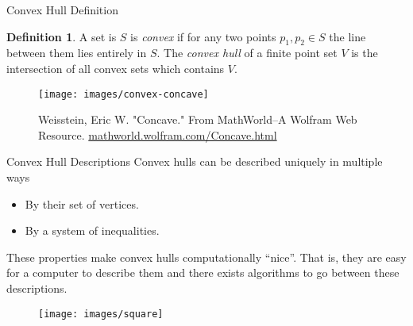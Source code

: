 \documentclass[9pt]{beamer}
\theoremstyle{definition}
\newtheorem{defn}{Definition}
\begin{document}
\begin{frame}[fragile]{Convex Hull Definition}
  \begin{defn}
    A set is $S$ is \emph{convex} if for any two points $p_1, p_2 \in S$ the line
    between them lies entirely in $S$. The \emph{convex hull} of a finite point set
    $V$ is the intersection of all convex sets which contains $V$.
  \end{defn}

  \begin{figure}
    \texttt{[image: images/convex-concave]}
    \caption{Weisstein, Eric W. "Concave." From MathWorld--A Wolfram Web Resource. \url{mathworld.wolfram.com/Concave.html}}

  \end{figure}
  
\end{frame}

\begin{frame}[fragile]{Convex Hull Descriptions}
  Convex hulls can be described uniquely in multiple ways

  \begin{itemize}
  \item By their set of vertices.
  \item By a system of inequalities.
  \end{itemize}

  These properties make convex hulls computationally ``nice''. That is, they are
  easy for a computer to describe them and there exists algorithms to go between
  these descriptions.
  \begin{figure}
    \texttt{[image: images/square]}
  \end{figure}

\end{frame}
\end{document}
